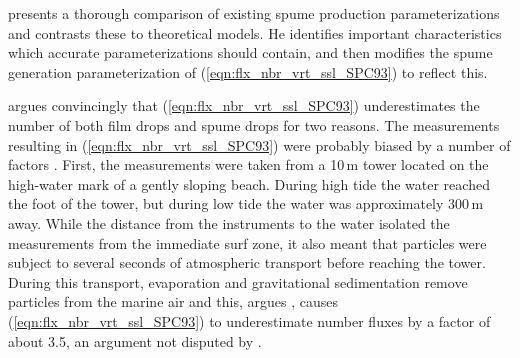 \documentclass[12pt,twoside]{book}
\begin{document}
\cite{And98} presents a thorough comparison of existing spume
production parameterizations \cite[][]{MSD86,SPC93} and contrasts
these to theoretical models.
He identifies important characteristics which accurate
parameterizations should contain, and then modifies the spume 
generation parameterization of \cite{SPC93}
(\ref{eqn:flx_nbr_vrt_ssl_SPC93}) to reflect this.

\cite{And98} argues convincingly that
(\ref{eqn:flx_nbr_vrt_ssl_SPC93}) underestimates the number of
both film drops and spume drops for two reasons.
The measurements resulting in (\ref{eqn:flx_nbr_vrt_ssl_SPC93}) were
probably biased by a number of factors \cite[]{And98}.
First, the measurements were taken from a 10\,m tower located on the
high-water mark of a gently sloping beach. 
During high tide the water reached the foot of the tower, but during
low tide the water was approximately 300\,m away.
While the distance from the instruments to the water isolated the
measurements from the immediate surf zone, it also meant that
particles were subject to several seconds of atmospheric transport 
before reaching the tower.
During this transport, evaporation and gravitational sedimentation 
remove particles from the marine air and this, argues
\citeauthor{And98}, causes (\ref{eqn:flx_nbr_vrt_ssl_SPC93}) to
underestimate number fluxes by a factor of about 3.5, an argument not
disputed by \citeauthor{SPC93}. 
\end{document}
